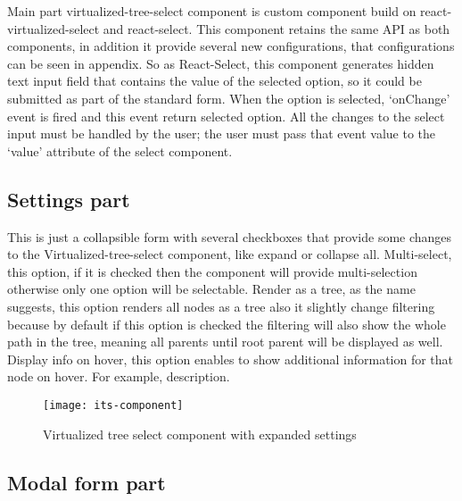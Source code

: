 Main part virtualized-tree-select component is custom component build on react-virtualized-select and react-select.
This component retains the same API as both components, in addition it provide several new configurations, that configurations can be seen in appendix. So as React-Select, this component generates hidden text input field that contains the value of the
selected option, so it could be submitted as part of the standard form. When the option is selected, ‘onChange’ event is
fired and this event return selected option. All the changes to the select input must be handled by the user; the user
must pass that event value to the ‘value’ attribute of the select component.



\subsection{Settings part}

This is just a collapsible form with several checkboxes that provide some changes to the Virtualized-tree-select
component, like expand or collapse all. Multi-select, this option, if it is checked then the component will provide
multi-selection otherwise only one option will be selectable. Render as a tree, as the name suggests, this option
renders all nodes as a tree also it slightly change filtering because by default if this option is checked the filtering
will also show the whole path in the tree, meaning all parents until root parent will be displayed as well. Display info
on hover, this option enables to show additional information for that node on hover. For example, description.

\begin{figure}[th]
    \centering
    \texttt{[image: its-component]}
    \decoRule
    \caption[Intelligent tree select component]{Virtualized tree select component with expanded settings}
    \label{fig:its-component}
 \end{figure}

\pagebreak

\subsection{Modal form part}


